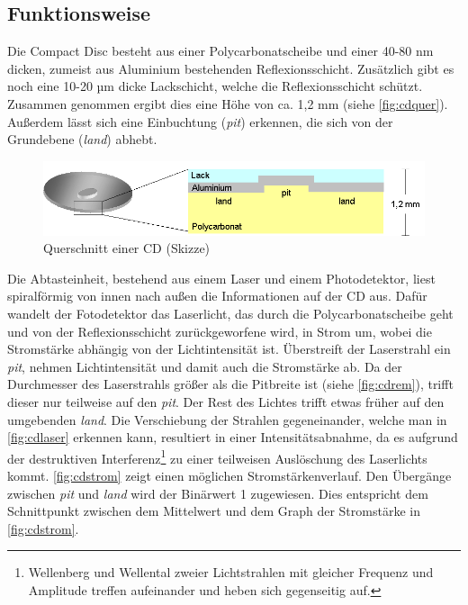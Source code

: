 \subsection{Funktionsweise}
\label{subsec:cdfunktionsweise}

Die Compact Disc besteht aus einer Polycarbonatscheibe und einer 40-80 nm
dicken, zumeist aus Aluminium bestehenden Reflexionsschicht. Zusätzlich gibt es
noch eine 10-20 µm dicke Lackschicht, welche die Reflexionsschicht schützt.
Zusammen genommen ergibt dies eine Höhe von ca. 1,2 mm (siehe
\autoref{fig:cdquer}). Außerdem lässt sich eine Einbuchtung (\textit{pit})
erkennen, die sich von der Grundebene (\textit{land}) abhebt. \cite{cfcd}

\begin{figure}[h]
    \begin{center}
        \begin{minipage}[t]{\textwidth}
            \begin{center}
                \includegraphics[height=0.1\textheight]{Bilder/Optische_Datentraeger_Die_Compact_Disc/Funktionsweise/cdquer.png}
                \caption[Querschnitt einer CD (Skizze) \newline \url{http://daten.didaktikchemie.uni-bayreuth.de/umat/cd_dvd/cd-ausschnitt.gif} (zuletzt aufgerufen am 07.08.2015)]{Querschnitt einer CD (Skizze)}
                \label{fig:cdquer}
            \end{center}
        \end{minipage}
    \end{center}
\end{figure}

Die Abtasteinheit, bestehend aus einem Laser und einem Photodetektor, liest
spiralförmig von innen nach außen die Informationen auf der CD aus. Dafür
wandelt der Fotodetektor das Laserlicht, das durch die Polycarbonatscheibe geht
und von der Reflexionsschicht zurückgeworfene wird, in Strom um, wobei die
Stromstärke abhängig von der Lichtintensität ist. Überstreift der Laserstrahl
ein \textit{pit}, nehmen Lichtintensität und damit auch die Stromstärke ab. Da
der Durchmesser des Laserstrahls größer als die Pitbreite ist (siehe
\autoref{fig:cdrem}), trifft dieser nur teilweise auf den \textit{pit}. Der Rest
des Lichtes trifft etwas früher auf den umgebenden \textit{land}. Die
Verschiebung der Strahlen gegeneinander, welche man in \autoref{fig:cdlaser}
erkennen kann, resultiert in einer Intensitätsabnahme, da es aufgrund der
destruktiven Interferenz\footnote{Wellenberg und Wellental zweier Lichtstrahlen
mit gleicher Frequenz und Amplitude treffen aufeinander und heben sich
gegenseitig auf.} zu einer teilweisen Auslöschung des Laserlichts kommt.
\autoref{fig:cdstrom} zeigt einen möglichen Stromstärkenverlauf. Den Übergänge
zwischen \textit{pit} und \textit{land} wird der Binärwert 1 zugewiesen. Dies
entspricht dem Schnittpunkt zwischen dem Mittelwert und dem Graph der
Stromstärke in \autoref{fig:cdstrom}. \cite{cdp}

